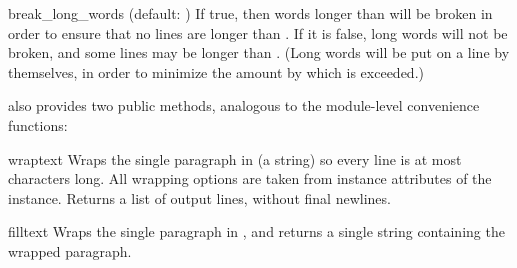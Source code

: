 \begin{memberdesc}{break_long_words}
(default: ) If true, then words longer than
 will be broken in order to ensure that no lines are
longer than .  If it is false, long words will not be
broken, and some lines may be longer than .  (Long words
will be put on a line by themselves, in order to minimize the amount
by which  is exceeded.)
\end{memberdesc}

 also provides two public methods, analogous to the
module-level convenience functions:

\begin{methoddesc}{wrap}{text}
Wraps the single paragraph in  (a string) so every line is
at most  characters long.  All wrapping options are
taken from instance attributes of the  instance.
Returns a list of output lines, without final newlines.
\end{methoddesc}

\begin{methoddesc}{fill}{text}
Wraps the single paragraph in , and returns a single string
containing the wrapped paragraph.
\end{methoddesc}
